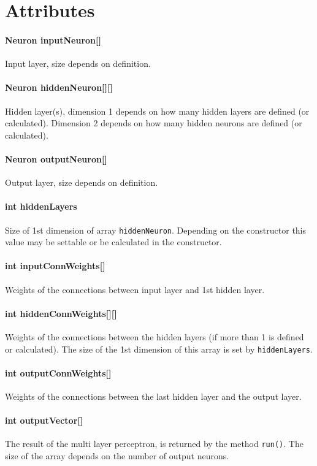 \section{Attributes}
\paragraph{Neuron inputNeuron[]}
Input layer, size depends on definition.

\paragraph{Neuron hiddenNeuron[][]}
Hidden layer(s), dimension 1 depends on how many hidden layers are defined (or calculated). Dimension 2 depends on how many hidden neurons are defined (or calculated).

\paragraph{Neuron outputNeuron[]}
Output layer, size depends on definition.

\paragraph{int hiddenLayers}
Size of 1st dimension of array \texttt{hiddenNeuron}. Depending on the constructor this value may be settable or be calculated in the constructor.

\paragraph{int inputConnWeights[]}
Weights of the connections between input layer and 1st hidden layer.

\paragraph{int hiddenConnWeights[][]}
Weights of the connections between the hidden layers (if more than 1 is defined or calculated). The size of the 1st dimension of this array is set by \texttt{hiddenLayers}.

\paragraph{int outputConnWeights[]}
Weights of the connections between the last hidden layer and the output layer.

\paragraph{int outputVector[]}
The result of the multi layer perceptron, is returned by the method \texttt{run()}. The size of the array depends on the number of output neurons.

